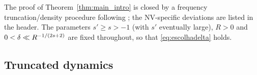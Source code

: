 %

The proof of Theorem~\ref{thm:main_intro} is closed by a frequency
truncation/density procedure following \cite[Section~5]{chcora}; the
NV-specific deviations are listed in the header. The parameters
$s'\ge s>-1$ (with $s'$ eventually large), $R>0$ and
$0<\delta\ll R^{-1/(2s+2)}$ are fixed throughout, so that
\eqref{eq:escolhadelta} holds.

\subsection{Truncated dynamics}

